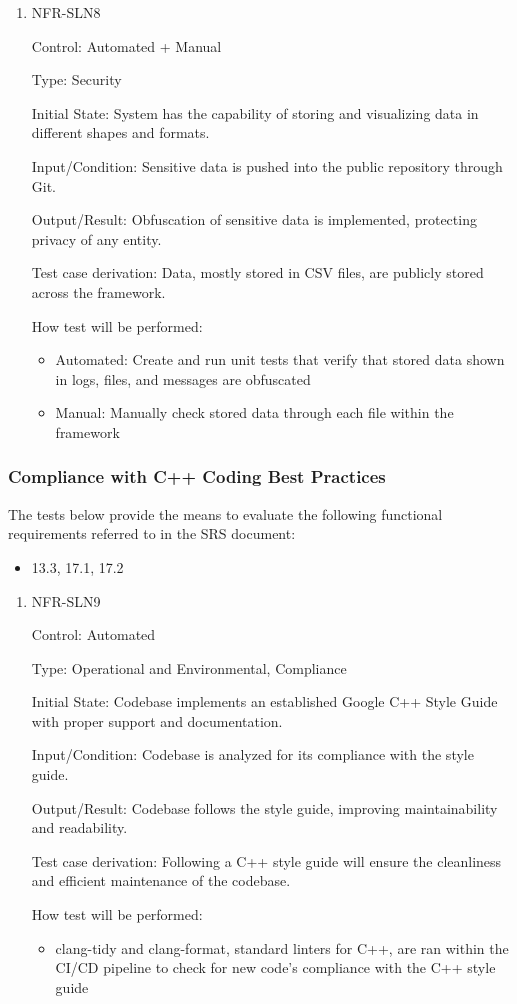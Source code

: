 \documentclass[12pt, titlepage]{article}
\begin{document}
\begin{enumerate}
\item NFR-SLN8

Control: Automated + Manual

Type: Security

Initial State: System has the capability of storing and visualizing data in different shapes and formats.

Input/Condition: Sensitive data is pushed into the public repository through Git.

Output/Result: Obfuscation of sensitive data is implemented, protecting privacy of any entity.

Test case derivation: Data, mostly stored in CSV files, are publicly stored across the framework.

How test will be performed:
\begin{itemize}
  \item Automated: Create and run unit tests that verify that stored data shown in logs, files, and messages are obfuscated
  \item Manual: Manually check stored data through each file within the framework
\end{itemize}

\end{enumerate}

\subsubsection{Compliance with C++ Coding Best Practices}

The tests below provide the means to evaluate the following functional requirements referred to in the SRS document:
\begin{itemize}
  \item 13.3, 17.1, 17.2
\end{itemize}

\begin{enumerate}
\item NFR-SLN9

Control: Automated

Type: Operational and Environmental, Compliance

Initial State: Codebase implements an established Google C++ Style Guide with proper support and documentation.

Input/Condition: Codebase is analyzed for its compliance with the style guide.

Output/Result: Codebase follows the style guide, improving maintainability and readability.

Test case derivation: Following a C++ style guide will ensure the cleanliness and efficient maintenance of the codebase.

How test will be performed:
\begin{itemize}
  \item clang-tidy and clang-format, standard linters for C++, are ran within the CI/CD pipeline to check for new code’s compliance with the C++ style guide
\end{itemize}

\end{enumerate}
\end{document}
